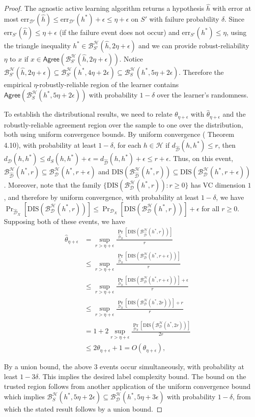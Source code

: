 \documentclass[11pt]{article}
\newcommand{\err}{\mathrm{err}}
\newcommand{\0}{\mathbf{0}}
\newcommand{\1}{\mathbf{1}}
\newcommand{\cB}{\mathcal{B}}
\newcommand{\cD}{\mathcal{D}}
\newcommand{\cH}{\mathcal{H}}
\newcommand{\Agree}{\mathsf{Agree}}
\newcommand{\changed}[1]{#1}
\begin{document}
\begin{proof}
The agnostic active learning algorithm returns a hypothesis $\hat{h}$ with error at most $\err_{\cD'}(\hat{h})\le\err_{\cD'}(h^*)+\epsilon\le\eta+\epsilon$ on $S'$ with failure probability $\delta$.
Since $\err_{S'}(\hat{h})\le \eta+\epsilon$ (if the failure event does not occur) and $\err_{S'}(h^*)\le \eta$, using the triangle inequality $h^*\in\cB_{S'}^\cH(\hat{h},2\eta+\epsilon)$ and we can provide robust-reliability $\eta$ to $x$ if $x\in\Agree(\cB_{S'}^\cH(\hat{h},2\eta+\epsilon))$. Notice $\cB_{S'}^\cH(\hat{h},2\eta+\epsilon)\subseteq \cB_{S'}^\cH(h^*,4\eta+2\epsilon)\subseteq \cB_{S}^\cH(h^*,5\eta+2\epsilon)$. Therefore the \changed{empirical} $\eta$-robustly-reliable region of the learner contains $\Agree(\cB_S^\cH(h^*,5\eta+2\epsilon))$ with probability $1-\delta$ over the learner's randomness.

To establish the distributional results, we need to relate $\theta_{\eta+\epsilon}$ with $\hat{\theta}_{\eta+\epsilon}$ and the robustly-reliable agreement region over the sample to one over the distribution, both using uniform convergence bounds. By uniform convergence (\cite{anthony2009neural} Theorem 4.10), with probability at least $1-\delta$, for each $h\in\cH$ if $d_{\hat{\cD}}(h,h^*)\le r$, then $d_{\cD}(h,h^*) \le  d_S(h,h^*)+\epsilon = d_{\hat{\cD}}(h,h^*)+\epsilon\le r+\epsilon$.
Thus, on this event, $\cB_{\hat{\cD}}^{\cH}(h^*,r)\subseteq \cB_{\cD}^{\cH}(h^*,r+\epsilon)$ and $\text{DIS}(\cB_{\hat{\cD}}^{\cH}(h^*,r))\subseteq \text{DIS}(\cB_{\cD}^{\cH}(h^*,r+\epsilon))$.
Moreover, note that the family
$\{ \text{DIS}(\cB_{\cD}^{\cH}(h^*,r)) : r \geq 0 \}$ has VC dimension $1$,
and therefore by uniform convergence,
with probability at least $1-\delta$,
we have $\Pr_{\hat{\cD}_{X}}[\text{DIS}(\cB_{\cD}^{\cH}(h^*,r))] \leq \Pr_{\cD_{X}}[\text{DIS}(\cB_{\cD}^{\cH}(h^*,r))]+\epsilon$
for all $r \geq 0$.
Supposing both of these events, we have
\begin{align*}
\hat{\theta}_{\eta+\epsilon}&=\sup_{r>\eta+ \epsilon}\frac{\Pr_{\hat{\cD}_X}
[\text{DIS}(\cB_{\hat{\cD}}^\cH(h^*, r))]}{r}
\\&\le \sup_{r>\eta+ \epsilon}\frac{\Pr_{\hat{\cD}_X}
[\text{DIS}(\cB_{\cD}^\cH(h^*,r+\epsilon))]}{r}
\\&\le \sup_{r>\eta+ \epsilon}\frac{\Pr_{\cD_X}
[\text{DIS}(\cB_{\cD}^\cH(h^*, r+\epsilon))]+\epsilon}{r}
\\&\le \sup_{r>\eta+ \epsilon}\frac{\Pr_{\cD_X}
[\text{DIS}(\cB_{\cD}^\cH(h^*,2r))]+r}{r}
\\&= 1+2\sup_{r>\eta+ \epsilon}\frac{\Pr_{\cD_X}
[\text{DIS}(\cB_{\cD}^\cH(h^*,2r))]}{2r}
\\&\leq 2\theta_{\eta+\epsilon}+1= O(\theta_{\eta+\epsilon}),
\end{align*}

By a union bound, the above $3$ events
occur simultaneously, with probability at
least $1-3\delta$.
This implies the desired label complexity bound. The bound on the trusted region follows from another application of the uniform convergence bound which implies $\cB_{S}^\cH(h^*,5\eta+2\epsilon)\subseteq \cB_{\cD}^\cH(h^*,5\eta+3\epsilon)$ with probability $1-\delta$,
from which the stated result follows
by a union bound.
\end{proof}
\end{document}
